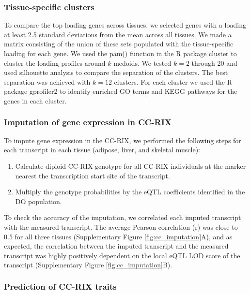 \documentclass[
]{article}
\providecommand{\tightlist}{%
  \setlength{\itemsep}{0pt}\setlength{\parskip}{0pt}}
\begin{document}
\subsubsection{Tissue-specific clusters}\label{tissue-specific-clusters}

To compare the top loading genes across tissues, we selected genes with
a loading at least 2.5 standard deviations from the mean across all
tissues. We made a matrix consisting of the union of these sets
populated with the tissue-specific loading for each gene. We used the
pam() function in the R package cluster \cite{Rcluster} to cluster the
loading profiles around \(k\) medoids. We tested \(k = 2\) through 20
and used silhouette analysis to compare the separation of the clusters.
The best separation was achieved with \(k = 12\) clusters. For each
cluster we used the R package gprofiler2 \cite{Rgprofiler2} to identify
enriched GO terms and KEGG pathways for the genes in each cluster.

\subsubsection{Imputation of gene expression in
CC-RIX}\label{imputation-of-gene-expression-in-cc-rix}

To impute gene expression in the CC-RIX, we performed the following
steps for each transcript in each tissue (adipose, liver, and skeletal
muscle):

\begin{enumerate}
\def\labelenumi{\arabic{enumi}.}
\tightlist
\item
  Calculate diploid CC-RIX genotype for all CC-RIX individuals at the
  marker nearest the transcription start site of the transcript.
\item
  Multiply the genotype probabilities by the eQTL coefficients
  identified in the DO population.
\end{enumerate}

To check the accuracy of the imputation, we correlated each imputed
transcript with the measured transcript. The average Pearson correlation
(r) was close to 0.5 for all three tissues (Supplementary Figure
\ref{fig:cc_imputation}A), and as expected, the correlation between the
imputed transcript and the measured transcript was highly positively
dependent on the local eQTL LOD score of the transcript (Supplementary
Figure \ref{fig:cc_imputation}B).

\subsubsection{Prediction of CC-RIX
traits}\label{prediction-of-cc-rix-traits}
\end{document}
